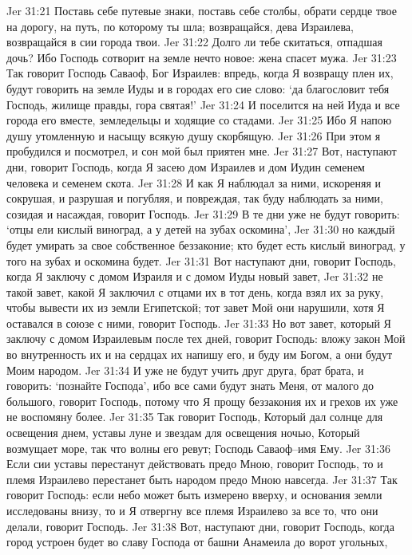 Jer 31:21  Поставь себе путевые знаки, поставь себе столбы, обрати сердце твое на дорогу, на путь, по которому ты шла; возвращайся, дева Израилева, возвращайся в сии города твои.
Jer 31:22  Долго ли тебе скитаться, отпадшая дочь? Ибо Господь сотворит на земле нечто новое: жена спасет мужа.
Jer 31:23  Так говорит Господь Саваоф, Бог Израилев: впредь, когда Я возвращу плен их, будут говорить на земле Иуды и в городах его сие слово: `да благословит тебя Господь, жилище правды, гора святая!'
Jer 31:24  И поселится на ней Иуда и все города его вместе, земледельцы и ходящие со стадами.
Jer 31:25  Ибо Я напою душу утомленную и насыщу всякую душу скорбящую.
Jer 31:26  При этом я пробудился и посмотрел, и сон мой был приятен мне.
Jer 31:27  Вот, наступают дни, говорит Господь, когда Я засею дом Израилев и дом Иудин семенем человека и семенем скота.
Jer 31:28  И как Я наблюдал за ними, искореняя и сокрушая, и разрушая и погубляя, и повреждая, так буду наблюдать за ними, созидая и насаждая, говорит Господь.
Jer 31:29  В те дни уже не будут говорить: `отцы ели кислый виноград, а у детей на зубах оскомина',
Jer 31:30  но каждый будет умирать за свое собственное беззаконие; кто будет есть кислый виноград, у того на зубах и оскомина будет.
Jer 31:31  Вот наступают дни, говорит Господь, когда Я заключу с домом Израиля и с домом Иуды новый завет,
Jer 31:32  не такой завет, какой Я заключил с отцами их в тот день, когда взял их за руку, чтобы вывести их из земли Египетской; тот завет Мой они нарушили, хотя Я оставался в союзе с ними, говорит Господь.
Jer 31:33  Но вот завет, который Я заключу с домом Израилевым после тех дней, говорит Господь: вложу закон Мой во внутренность их и на сердцах их напишу его, и буду им Богом, а они будут Моим народом.
Jer 31:34  И уже не будут учить друг друга, брат брата, и говорить: `познайте Господа', ибо все сами будут знать Меня, от малого до большого, говорит Господь, потому что Я прощу беззакония их и грехов их уже не воспомяну более.
Jer 31:35  Так говорит Господь, Который дал солнце для освещения днем, уставы луне и звездам для освещения ночью, Который возмущает море, так что волны его ревут; Господь Саваоф--имя Ему.
Jer 31:36  Если сии уставы перестанут действовать предо Мною, говорит Господь, то и племя Израилево перестанет быть народом предо Мною навсегда.
Jer 31:37  Так говорит Господь: если небо может быть измерено вверху, и основания земли исследованы внизу, то и Я отвергну все племя Израилево за все то, что они делали, говорит Господь.
Jer 31:38  Вот, наступают дни, говорит Господь, когда город устроен будет во славу Господа от башни Анамеила до ворот угольных,
